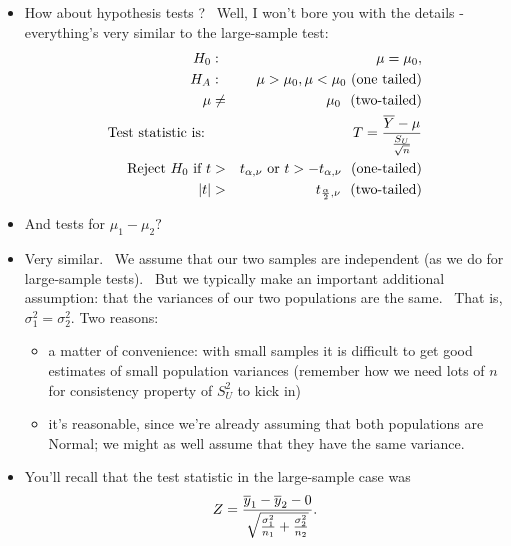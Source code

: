 \documentclass[11pt]{article}
\begin{document}
\begin{itemize}
\item How about hypothesis tests ? \ Well, I won't bore you with the details
- everything's very similar to the large-sample test:%
\begin{eqnarray*}
H_{0} &:&\mu =\mu _{0}, \\
H_{A} &:&\mu >\mu _{0},\mu <\mu _{0}\text{ (one tailed)} \\
\mu &\neq &\mu _{0}\text{ \ (two-tailed)} \\
\text{Test statistic is}\text{: } &&T=\frac{\overline{Y}-\mu }{\frac{S_{U}}{%
\sqrt{n}}} \\
\text{Reject }H_{0}\text{ if }t &>&t_{\alpha ,\nu }\text{ or }t>-t_{\alpha
,\nu }\text{ \ (one-tailed)} \\
\text{ }|t| &>&t_{\frac{\alpha }{2},\nu }\text{ \ (two-tailed)}
\end{eqnarray*}

\item And tests for $\mu _{1}-\mu _{2}?$

\item Very similar. \ We assume that our two samples are independent (as we
do for large-sample tests). \ But we typically make an important additional
assumption: that the variances of our two populations are the same. \ That
is, $\sigma _{1}^{2}=\sigma _{2}^{2}.$ Two reasons:

\begin{itemize}
\item a matter of convenience: with small samples it is difficult to get
good estimates of small population variances (remember how we need lots of $%
n $ for consistency property of $S_{U}^{2}$ to kick in)

\item it's reasonable, since we're already assuming that both populations
are Normal; we might as well assume that they have the same variance.
\end{itemize}

\item You'll recall that the test statistic in the large-sample case was%
\begin{equation*}
Z=\frac{\overline{y}_{1}-\overline{y}_{2}-0}{\sqrt{\frac{\sigma _{1}^{2}}{%
n_{1}}+\frac{\sigma _{2}^{2}}{n_{2}}}}.
\end{equation*}


\end{itemize}
\end{document}
